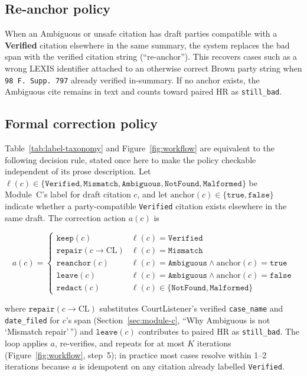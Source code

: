 \subsection{Re-anchor policy}
When an Ambiguous or unsafe citation has draft parties compatible with a \textbf{Verified} citation elsewhere in the same summary, the system replaces the bad span with the verified citation string (``re-anchor''). This recovers cases such as a wrong LEXIS identifier attached to an otherwise correct Brown party string when \texttt{98 F.\ Supp.\ 797} already verified in-summary. If no anchor exists, the Ambiguous cite remains in text and counts toward paired HR as \texttt{still\_bad}.

\subsection{Formal correction policy}
\label{sec:correction-formal}
Table~\ref{tab:label-taxonomy} and Figure~\ref{fig:workflow} are equivalent to the following decision rule, stated once here to make the policy checkable independent of its prose description. Let $\ell(c) \in \{\texttt{Verified}, \texttt{Mismatch}, \texttt{Ambiguous}, \texttt{NotFound}, \texttt{Malformed}\}$ be Module~C's label for draft citation $c$, and let $\mathrm{anchor}(c) \in \{\texttt{true}, \texttt{false}\}$ indicate whether a party-compatible \texttt{Verified} citation exists elsewhere in the same draft. The correction action $a(c)$ is

\[
a(c) =
\begin{cases}
  \texttt{keep}(c) & \ell(c) = \texttt{Verified} \\
  \texttt{repair}(c \to \mathrm{CL}) & \ell(c) = \texttt{Mismatch} \\
  \texttt{reanchor}(c) & \ell(c) = \texttt{Ambiguous} \wedge \mathrm{anchor}(c) = \texttt{true} \\
  \texttt{leave}(c) & \ell(c) = \texttt{Ambiguous} \wedge \mathrm{anchor}(c) = \texttt{false} \\
  \texttt{redact}(c) & \ell(c) \in \{\texttt{NotFound}, \texttt{Malformed}\}
\end{cases}
\]

where $\texttt{repair}(c \to \mathrm{CL})$ substitutes CourtListener's verified \texttt{case\_name} and \texttt{date\_filed} for $c$'s span (Section~\ref{sec:module-c}, ``Why Ambiguous is not `Mismatch repair'\,'') and $\texttt{leave}(c)$ contributes to paired HR as \texttt{still\_bad}. The loop applies $a$, re-verifies, and repeats for at most $K$ iterations (Figure~\ref{fig:workflow}, step~5); in practice most cases resolve within 1--2 iterations because $a$ is idempotent on any citation already labelled \texttt{Verified}.

